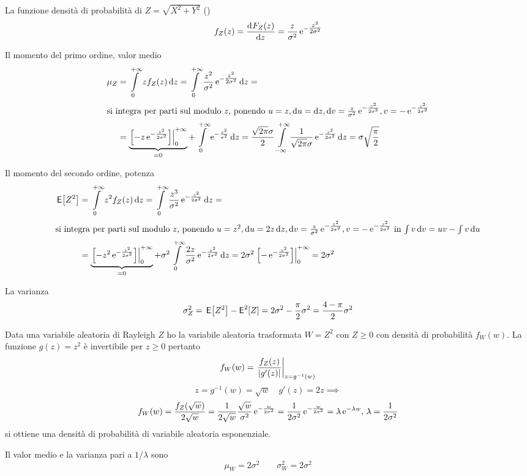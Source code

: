 \begin{esempio}
La funzione densità di probabilità di $Z=\sqrt{X^2+Y^2}$ ()\label{eq:Rayleigh}
\begin{equation}\label{eq:formula_rayleigh}
f_Z(z)=\deriv{F_Z(z)}{z}=\frac{z}{\sigma^2}\e{-\tfrac{z^2}{2\sigma^2}}
\end{equation}

Il momento del primo ordine, valor medio
\[\begin{split}\mu_Z&=\intd{0}{+\infty}{z f_Z(z)}{z}=\intd{0}{+\infty}{\frac{z^2}{\sigma^2}\e{-\tfrac{z^2}{2\sigma^2}}}{z}=\\
\intertext{si integra per parti sul modulo $z$, ponendo $u=z, \diff u=\diff z, \diff v=\frac{z}{\sigma^2}\e{-\frac{z^2}{2\sigma^2}}, v=-\e{-\frac{z^2}{2\sigma^2}}$}
&=\underbrace{\bound{0}{+\infty}{-z\e{-\frac{z^2}{2\sigma^2}}}}_{=0}+\intd{0}{+\infty}{\e{-\frac{z^2}{\sigma^2}}}{z}=\frac{\sqrt{2\pi}\sigma}{2}\intinf{\frac{1}{\sqrt{2\pi}\sigma}\e{-\frac{z^2}{2\sigma^2}}}{z}=\sigma\sqrt{\frac{\pi}{2}}
\end{split}\]

Il momento del secondo ordine, potenza
\[\begin{split}\E{Z^2}&=\intd{0}{+\infty}{z^2 f_Z(z)}{z}=\intd{0}{+\infty}{\frac{z^3}{\sigma^2}\e{-\frac{z^2}{2\sigma^2}}}{z}=\\
\intertext{si integra per parti sul modulo $z$, ponendo $u=z^2, \diff u=2z\diff z, \diff v=\frac{z}{\sigma^2}\e{-\frac{z^2}{2\sigma^2}}, v=-\e{-\frac{z^2}{2\sigma^2}}$ in $\int v\diff v=u v-\int v\diff u$}
&=\underbrace{\bound{0}{+\infty}{-z^2\e{-\frac{z^2}{2\sigma^2}}}}_{=0}+\sigma^2\intd{0}{+\infty}{\frac{2z}{\sigma^2}\e{-\frac{z^2}{2\sigma^2}}}{z}=2\sigma^2\bound{0}{+\infty}{-\e{-\frac{z^2}{2\sigma^2}}}=2\sigma^2\end{split}\]

La varianza \[\sigma^2_Z=\E{Z^2}-\Esp^2[Z]=2\sigma^2-\frac{\pi}{2}\sigma^2=\frac{4-\pi}{2}\sigma^2\]
\end{esempio}

\begin{esempio}
Data una variabile aleatoria di Rayleigh $Z$ ho la variabile aleatoria trasformata $W=Z^2$ con $Z\geq 0$ con densità di probabilità $f_W(w)$. La funzione $g(z)=z^2$ è invertibile per $z\geq 0$ pertanto
\[f_W(w)=\restrict{\frac{f_Z(z)}{\abs{g'(z)}}}{z=g^{-1}(w)}\]
\[z=g^{-1}(w)=\sqrt{w}\quad g'(z)=2z \implies\] \[f_W(w)=\frac{f_Z(\sqrt{w})}{2\sqrt{w}}=\frac{1}{2\sqrt{w}}\frac{\sqrt{w}}{\sigma^2}\e{-\frac{w}{2\sigma^2}}=\frac{1}{2\sigma^2}\e{-\frac{w}{2\sigma^2}}=\lambda\e{-\lambda w},\,\lambda=\frac{1}{2\sigma^2}\]
si ottiene una densità di probabilità di variabile aleatoria esponenziale.

Il valor medio e la varianza pari a $1/\lambda$ sono
\[\mu_W=2\sigma^2\qquad\sigma^2_W=2\sigma^2\]
\end{esempio}

